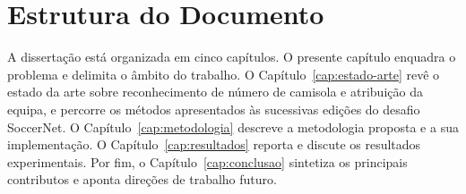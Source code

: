 \section{Estrutura do Documento}\label{sec:estrutura}

A dissertação está organizada em cinco capítulos. O presente capítulo enquadra o problema e delimita
o âmbito do trabalho. O Capítulo~\ref{cap:estado-arte} revê o estado da arte sobre reconhecimento de
número de camisola e atribuição da equipa, e percorre os métodos apresentados às sucessivas edições
do desafio SoccerNet. O Capítulo~\ref{cap:metodologia} descreve a metodologia proposta e a sua
implementação. O Capítulo~\ref{cap:resultados} reporta e discute os resultados experimentais. Por
fim, o Capítulo~\ref{cap:conclusao} sintetiza os principais contributos e aponta direções de
trabalho futuro.
